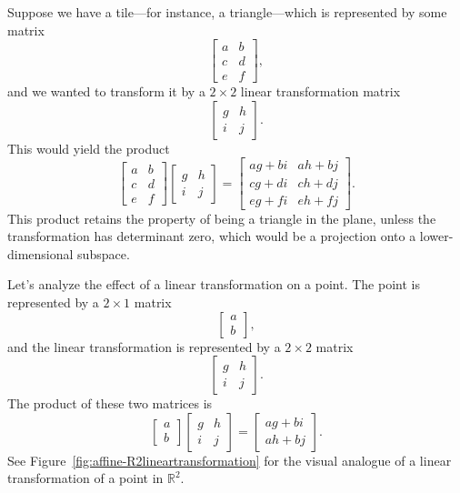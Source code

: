 Suppose we have a tile---for instance, a triangle---which is represented by some matrix
\[
    \begin{bmatrix}
        a & b \\
        c & d \\
        e & f
    \end{bmatrix},
\]
and we wanted to transform it by a \(2\times2\) linear transformation matrix 
\[
    \begin{bmatrix}
        g & h \\
        i & j
    \end{bmatrix}.
\]
This would yield the product
\[
    \begin{bmatrix}
        a & b \\
        c & d \\
        e & f
    \end{bmatrix}
    \begin{bmatrix}
        g & h \\
        i & j
    \end{bmatrix}
    =
    \begin{bmatrix}
        ag+bi & ah+bj \\
        cg+di & ch+dj \\
        eg+fi & eh+fj
    \end{bmatrix}.
\]
This product retains the property of being a triangle in the plane, 
unless the transformation has determinant zero, which would be a 
projection onto a lower-dimensional subspace.

Let's analyze the effect of a linear transformation on a point.
The point is represented by a \(2\times1\) matrix
\[
    \begin{bmatrix}
        a \\
        b 
    \end{bmatrix},
\]
and the linear transformation is represented by a \(2\times2\) matrix
\[
    \begin{bmatrix}
        g & h \\
        i & j
    \end{bmatrix}.
\]
The product of these two matrices is
\[
    \begin{bmatrix}
        a \\
        b 
    \end{bmatrix}
    \begin{bmatrix}
        g & h \\
        i & j
    \end{bmatrix}
    =
    \begin{bmatrix}
        ag+bi \\
        ah+bj
    \end{bmatrix}.
\]
See Figure~\ref{fig:affine-R2lineartransformation} for the visual 
analogue of a linear transformation of a point in \(\mathbb{R}^{2}\).

